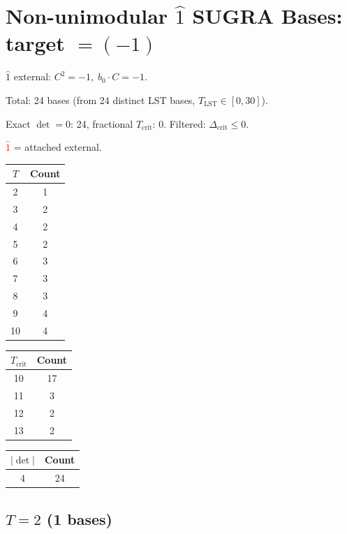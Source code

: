 \documentclass[10pt]{article}
\begin{document}
\section*{Non-unimodular $\hat{1}$ SUGRA Bases: target $= (-1)$}

$\hat{1}$ external: $C^2=-1,\; b_0\cdot C=-1$.

Total: 24 bases (from 24 distinct LST bases, $T_{\text{LST}} \in [0, 30]$).

Exact $\det=0$: 24, fractional $T_{\text{crit}}$: 0. Filtered: $\Delta_{\text{crit}} \leq 0$.

\textcolor{red}{$\hat{1}$} = attached external.

\begin{center}
\begin{tabular}{c|c}
\toprule
$T$ & Count \\
\midrule
2 & 1 \\
3 & 2 \\
4 & 2 \\
5 & 2 \\
6 & 3 \\
7 & 3 \\
8 & 3 \\
9 & 4 \\
10 & 4 \\
\bottomrule
\end{tabular}
\qquad\qquad
\begin{tabular}{c|c}
\toprule
$T_{\text{crit}}$ & Count \\
\midrule
10 & 17 \\
11 & 3 \\
12 & 2 \\
13 & 2 \\
\bottomrule
\end{tabular}
\end{center}

\begin{center}
\begin{tabular}{c|c}
\toprule
$|\det|$ & Count \\
\midrule
4 & 24 \\
\bottomrule
\end{tabular}
\end{center}

\newpage

\subsection*{$T = 2$ \quad (1 bases)}
\smallskip
\end{document}
